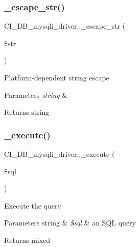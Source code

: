 \subsubsection{\texorpdfstring{\+\_\+escape\+\_\+str()}{\_escape\_str()}}
{\footnotesize\ttfamily C\+I\+\_\+\+D\+B\+\_\+mysqli\+\_\+driver\+::\+\_\+escape\+\_\+str (\begin{DoxyParamCaption}\item[{}]{\$str }\end{DoxyParamCaption})\hspace{0.3cm}{\ttfamily [protected]}}

Platform-\/dependent string escape


\begin{DoxyParams}{Parameters}
{\em string} & \\
\hline
\end{DoxyParams}
\begin{DoxyReturn}{Returns}
string 
\end{DoxyReturn}
\mbox{\label{class_c_i___d_b__mysqli__driver_a406e3425d92098146f4959d7bb578d18}} 
\subsubsection{\texorpdfstring{\+\_\+execute()}{\_execute()}}
{\footnotesize\ttfamily C\+I\+\_\+\+D\+B\+\_\+mysqli\+\_\+driver\+::\+\_\+execute (\begin{DoxyParamCaption}\item[{}]{\$sql }\end{DoxyParamCaption})\hspace{0.3cm}{\ttfamily [protected]}}

Execute the query


\begin{DoxyParams}[1]{Parameters}
string & {\em \$sql} & an S\+QL query \\
\hline
\end{DoxyParams}
\begin{DoxyReturn}{Returns}
mixed 
\end{DoxyReturn}
\mbox{\label{class_c_i___d_b__mysqli__driver_a1f09424e41aacd25cf17130a2346c2c7}} 

